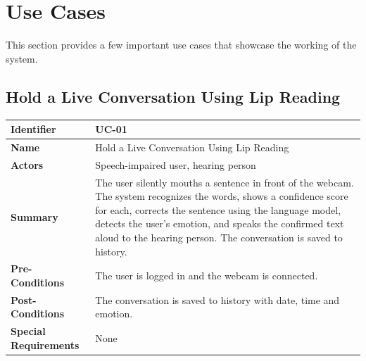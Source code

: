 \documentclass{FastFyp}
\begin{document}
\section{Use Cases}
This section provides a few important use cases that showcase the working of the system.


\subsection{Hold a Live Conversation Using Lip Reading}

\begingroup
\renewcommand{\arraystretch}{1.3}
\setlength{\parskip}{0pt}
\setlength{\LTpre}{0pt}
\setlength{\LTpost}{0pt}

\noindent
\begin{tabularx}{\linewidth}{|l|X|}
\hline
\textbf{Identifier} & UC-01 \\ \hline
\textbf{Name} & Hold a Live Conversation Using Lip Reading \\ \hline
\textbf{Actors} & Speech-impaired user, hearing person \\ \hline
\textbf{Summary} & The user silently mouths a sentence in front of the webcam. The system recognizes the words, shows a confidence score for each, corrects the sentence using the language model, detects the user's emotion, and speaks the confirmed text aloud to the hearing person. The conversation is saved to history. \\ \hline
\textbf{Pre-Conditions} & The user is logged in and the webcam is connected. \\ \hline
\textbf{Post-Conditions} & The conversation is saved to history with date, time and emotion. \\ \hline
\textbf{Special Requirements} & None \\ \hline
\end{tabularx}
\nopagebreak
\end{document}
